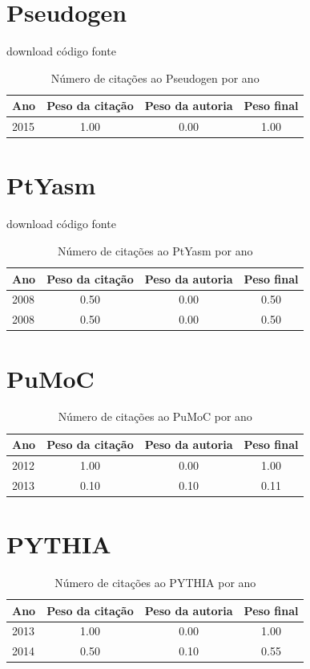 \section{Pseudogen}
\checkmark download
\checkmark código fonte
\begin{table}[H]
\caption{Número de citações ao Pseudogen por ano}
\centering
\begin{tabular}{| l | c | c | c |}
  \hline
  Ano & Peso da citação & Peso da autoria & Peso final \\
  \hline
  2015
    & 1.00
    & 0.00
    & {\color{blue} 1.00} \\
\hline
\end{tabular}
\end{table}
\section{PtYasm}
\checkmark download
\checkmark código fonte
\begin{table}[H]
\caption{Número de citações ao PtYasm por ano}
\centering
\begin{tabular}{| l | c | c | c |}
  \hline
  Ano & Peso da citação & Peso da autoria & Peso final \\
  \hline
  2008
    & 0.50
    & 0.00
    & {\color{blue} 0.50} \\
  2008
    & 0.50
    & 0.00
    & {\color{blue} 0.50} \\
\hline
\end{tabular}
\end{table}
\section{PuMoC}
\begin{table}[H]
\caption{Número de citações ao PuMoC por ano}
\centering
\begin{tabular}{| l | c | c | c |}
  \hline
  Ano & Peso da citação & Peso da autoria & Peso final \\
  \hline
  2012
    & 1.00
    & 0.00
    & {\color{blue} 1.00} \\
\hline
  2013
    & 0.10
    & 0.10
    & {\color{red} 0.11} \\
\hline
\end{tabular}
\end{table}
\section{PYTHIA}
\begin{table}[H]
\caption{Número de citações ao PYTHIA por ano}
\centering
\begin{tabular}{| l | c | c | c |}
  \hline
  Ano & Peso da citação & Peso da autoria & Peso final \\
  \hline
  2013
    & 1.00
    & 0.00
    & {\color{blue} 1.00} \\
\hline
  2014
    & 0.50
    & 0.10
    & {\color{blue} 0.55} \\
\hline
\end{tabular}
\end{table}
